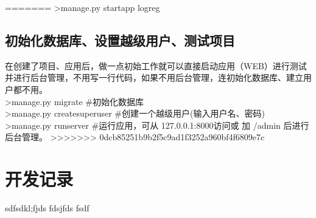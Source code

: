\documentclass[a4paper]{ctexart}
\begin{document}
=======
      \indent >manage.py startapp logreg \\
      \indent
    \subsection{初始化数据库、设置越级用户、测试项目}
    在创建了项目、应用后，做一点初始工作就可以直接启动应用（WEB）进行测试并进行后台管理，不用写一行代码，如果不用后台管理，连初始化数据库、建立用户都不用。\\
      \indent >manage.py migrate  \#初始化数据库 \\
      \indent >manage.py createsuperuser \#创建一个越级用户(输入用户名、密码)\\
      \indent >manage.py runserver \#运行应用，可从 127.0.0.1:8000访问或 加 /admin 后进行后台管理。
>>>>>>> 0dcb85251b9b2f5c9ad1f3252a960bf4f6809e7c
  \newpage
  \section{开发记录}
  sdfsdkl;fjds
  fdsjfds
  fsdf
    \subsection{}
          
  
    
  
\end{document}
